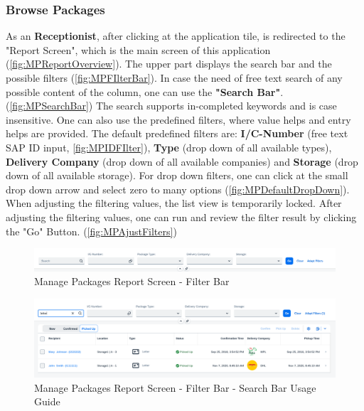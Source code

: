 \subsubsection{Browse Packages}
As an \textbf{Receptionist}, after clicking at the application tile, is redirected to the "Report Screen", which is the main screen of this application (\autoref{fig:MPReportOverview}). 
The upper part displays the search bar and the possible filters (\autoref{fig:MPFIlterBar}). 
In case the need of free text search of any possible content of the column, one can use the \textbf{"Search Bar"}. (\autoref{fig:MPSearchBar}) The search supports in-completed keywords and is case insensitive. One can also use the predefined filters, where value helps and entry helps are provided.
The default predefined filters are: \textbf{I/C-Number} (free text SAP ID input, \autoref{fig:MPIDFIlter}), \textbf{Type} (drop down of all available types), \textbf{Delivery Company} (drop down of all available companies) and \textbf{Storage} (drop down of all available storage). 
For drop down filters, one can click at the small drop down arrow and select zero to many options (\autoref{fig:MPDefaultDropDown}). When adjusting the filtering values, the list view is temporarily locked. After adjusting the filtering values, one can run and review the filter result by clicking the "Go" Button. (\autoref{fig:MPAjustFilters})

\begin{figure}[H]
	\centering
	\includegraphics[width=1\linewidth]{images/user_doc/managePack/ReportScreen/browse/FilterBar.png}
	\caption{Manage Packages Report Screen - Filter Bar}
	\label{fig:MPFIlterBar}
\end{figure}

\begin{figure}[H]
	\centering
	\includegraphics[width=1\linewidth]{images/user_doc/managePack/ReportScreen/browse/defaultSearchBarUsage.png}
	\caption{Manage Packages Report Screen - Filter Bar - Search Bar Usage Guide}
	\label{fig:MPSearchBar}
\end{figure}

